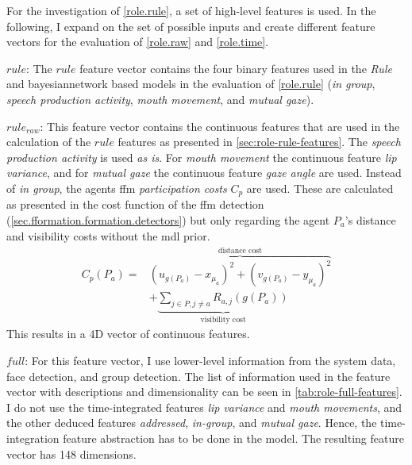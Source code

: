 For the investigation of \cref{role.rule}, a set of high-level features is used.
In the following, I expand on the set of possible inputs and create different feature vectors for the evaluation of \cref{role.raw} and \cref{role.time}.
\begin{description}
    \item{\(rule\):} The \(rule\) feature vector contains the four binary features used in the \emph{Rule} and \gls{bayesiannetwork} based models in the evaluation of \cref{role.rule} (\emph{in group}, \emph{speech production activity}, \emph{mouth movement}, and \emph{mutual gaze}).
    \item{\(rule_{raw}\):} This feature vector contains the continuous features that are used in the calculation of the \(rule\) features as presented in \cref{sec:role-rule-features}.
    The \emph{speech production activity} is used \emph{as is}.
    For \emph{mouth movement} the continuous feature \emph{lip variance}, and for \emph{mutual gaze} the continuous feature \emph{gaze angle} are used.
    Instead of \emph{in group}, the agents \gls{ffm} \emph{participation costs} \(C_p\) are used.
    These are calculated as presented in the cost function of the \gls{ffm} detection (\cref{sec.fformation.formation.detectors}) but only regarding the agent \(P_a\)'s distance and visibility costs without the \gls{mdl} prior.
\[
\begin{split}
C_p(P_a) = & \overbrace{(u_{g(P_a)}-x_{\mu_a})^2+(v_{g(P_a)}-y_{\mu_a})^2}^{\text{distance cost}} \\ & + \underbrace{\sum_{j \in P, j \neq a}{R_{a,j}(g(P_a))}}_{\text{visibility cost}}
\end{split}
\]
    This results in a 4D vector of continuous features.
    \item{\(full\):} For this feature vector, I use lower-level information from the system data, face detection, and group detection.
    The list of information used in the feature vector with descriptions and dimensionality can be seen in \cref{tab:role-full-features}.
    I do not use the time-integrated features \emph{lip variance} and \emph{mouth movements}, and the other deduced features \emph{addressed}, \emph{in-group}, and \emph{mutual gaze}.
    Hence, the time-integration feature abstraction has to be done in the model.
    The resulting feature vector has 148 dimensions.
\end{description}
